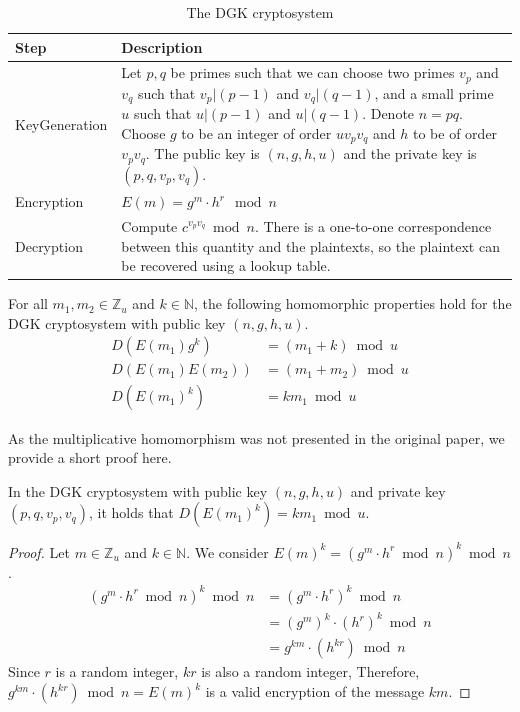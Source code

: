 \begin{table}[ht]
	\caption{The DGK cryptosystem}
	\label{tab:dgk_summary}
    \begin{tabular}{
        p{}
        p{}}
		\toprule
		Step & Description\\
        \midrule
            Key\newline Generation &
            Let $p,q$ be primes such that we can choose two primes $v_p$ and $v_q$ such that $v_p | (p-1)$ and $v_q | (q-1)$, and a small prime $u$ such that $u | (p-1)$ and $u | (q-1)$. \newline
            Denote $n = pq$. \newline
            Choose $g$ to be an integer of order $uv_pv_q$ and $h$ to be of order $v_pv_q$.\newline
            The public key is $(n,g,h,u)$ and the private key is $(p,q,v_p,v_q)$.
            \\
            Encryption &
            $E(m) = g^m \cdot h^r \mod{n}$
            \\
            Decryption &
            Compute $c^{v_pv_q} \bmod n$. There is a one-to-one correspondence between this quantity and the plaintexts, so the plaintext can be recovered using a lookup table.
            \\
	    \bottomrule
    \end{tabular}
\end{table}

For all $m_1,m_2 \in \mathbb{Z}_u$ and $k\in \mathbb{N}$, the following homomorphic properties hold for the DGK cryptosystem with public key $(n,g,h,u)$.
\begin{align*}
    D(E(m_1)g^k) &=(m_1+k)\bmod u\\
    D(E(m_1)E(m_2)) &=(m_1+m_2)\bmod u\\
    D(E(m_1)^k) &= km_1\bmod u
\end{align*}

As the multiplicative homomorphism was not presented in the original paper, we provide a short proof here.
\begin{theorem}
    In the DGK cryptosystem with public key $(n,g,h,u)$ and private key $(p,q,v_p,v_q)$, it holds that $D(E(m_1)^k) = km_1\bmod u$.
\end{theorem}
\begin{proof}
  Let $m \in \mathbb{Z}_u$ and $k\in \mathbb{N}$.
  We consider $E(m)^k = (g^m \cdot h^r \bmod{n})^k\bmod n$.
  \begin{align*}
    (g^m \cdot h^r \bmod{n})^k \bmod n
    &= (g^m \cdot h^r)^k \bmod{n}\\
    &= (g^m)^k \cdot (h^r)^k \bmod{n}\\
    &= g^{km} \cdot (h^{kr}) \bmod{n}
  \end{align*}
  Since $r$ is a random integer, $kr$ is also a random integer, Therefore, $g^{km} \cdot (h^{kr}) \bmod{n} = E(m)^k$ is a valid encryption of the message $km$.
\end{proof}

